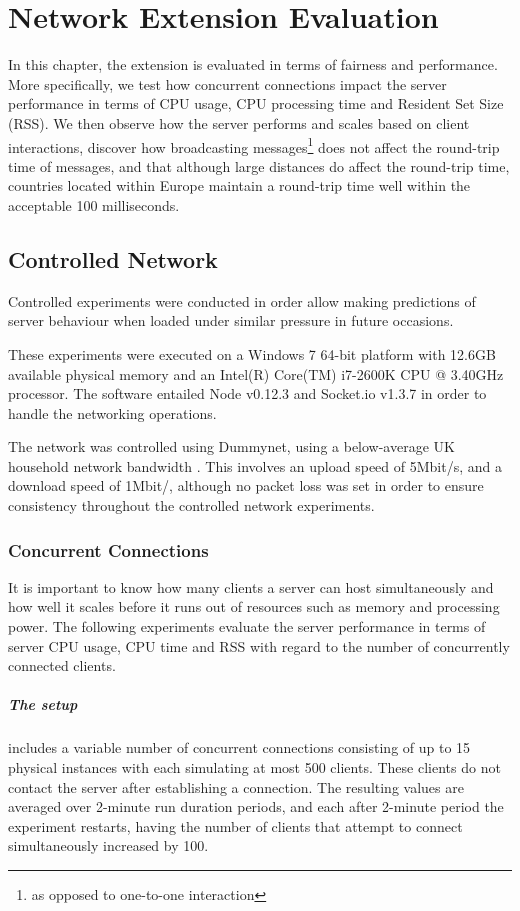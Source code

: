 \documentclass[bsc, 12pt, twoside, singlespacing, parskip, abbrevs, notimes, normalheadings, logo]{styles/infthesis}
\begin{document}
\chapter{Network Extension Evaluation}
In this chapter, the extension is evaluated in terms of fairness and performance. More specifically, we test how concurrent connections impact the server performance in terms of CPU usage, CPU processing time and Resident Set Size (RSS). We then observe how the server performs and scales based on client interactions, discover how broadcasting messages\footnote{as opposed to one-to-one interaction} does not affect the round-trip time of messages, and that although large distances do affect the round-trip time, countries located within Europe maintain a round-trip time well within the acceptable 100 milliseconds.

\section{Controlled Network}
Controlled experiments were conducted in order allow making predictions of server behaviour when loaded under similar pressure in future occasions.

These experiments were executed on a Windows 7 64-bit platform with 12.6GB available physical memory and an Intel(R) Core(TM) i7-2600K CPU @ 3.40GHz processor. The software entailed Node v0.12.3 and Socket.io v1.3.7 in order to handle the networking operations.

The network was controlled using Dummynet, using a below-average UK household network bandwidth \cite{household_bandwidth}. This involves an upload speed of 5Mbit/s, and a download speed of 1Mbit/, although no packet loss was set in order to ensure consistency throughout the controlled network experiments.

\subsection{Concurrent Connections}
It is important to know how many clients a server can host simultaneously and how well it scales before it runs out of resources such as memory and processing power. The following experiments evaluate the server performance in terms of server CPU usage, CPU time and RSS with regard to the number of concurrently connected clients.

\paragraph*{The setup} includes a variable number of concurrent connections consisting of up to 15 physical instances with each simulating at most 500 clients. These clients  do not contact the server after establishing a connection. The resulting values are averaged over 2-minute run duration periods, and each after 2-minute period the experiment restarts, having the number of clients that attempt to connect simultaneously increased by 100.
\end{document}

